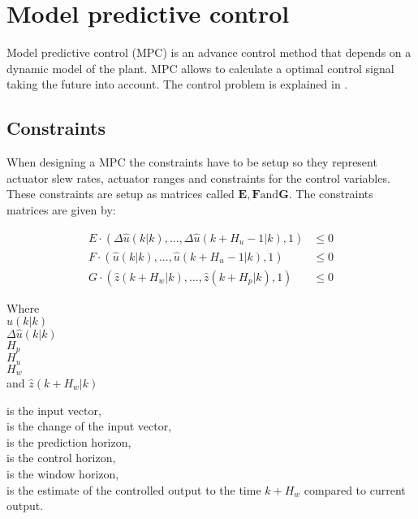 \section{Model predictive control}

Model predictive control (MPC) is an advance control method that depends on a dynamic model of the plant. MPC allows to calculate a optimal control signal taking the future into account. The control problem is explained in .

\subsection{Constraints}

When designing a MPC the constraints have to be setup so they represent actuator slew rates, actuator ranges and constraints for the control variables. These constraints are setup as matrices called $\pmb{E}, \pmb{F} \text{and} \pmb{G}$. The constraints matrices are given by: 

\begin{align}
E \cdot (\Delta\hat u(k|k),...,\Delta\hat u(k+H_u-1|k),1) &\leq 0 \\
\label{eq:slewrate}
F \cdot (\hat u(k|k),...,\hat u(k+H_u-1|k),1) &\leq 0 \\
\label{eq:actranges}
G \cdot (\hat z(k+H_w|k),...,\hat z(k+H_p|k),1) &\leq 0
\label{eq:controlvar}
\end{align}


 \begin{minipage}[t]{0.20\textwidth}
 Where\\
 \hspace*{8mm} $\hat u(k|k)$ \\
 \hspace*{8mm} $\Delta\hat u(k|k)$ \\
 \hspace*{8mm} $H_p$ \\
 \hspace*{8mm} $H_u$ \\
 \hspace*{8mm} $H_w$ \\
 and \hspace*{0.7mm} $\hat z(k+H_w|k)$	
 \end{minipage}
 \begin{minipage}[t]{0.68\textwidth}
 \vspace*{2mm}
 is the input vector, \\
 is the change of the input vector, \\
 is the prediction horizon,\\
 is the control horizon, \\
 is the window horizon, \\
 is the estimate of the controlled output to the time $k+H_w$ compared to current output.
 \end{minipage}

